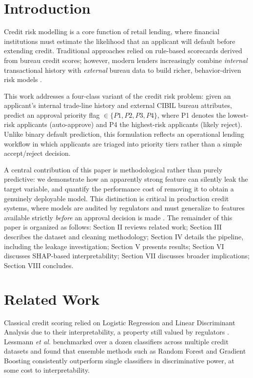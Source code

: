 \documentclass[conference]{IEEEtran}
\begin{document}
\section{Introduction}

Credit risk modelling is a core function of retail lending, where financial institutions must estimate the likelihood that an applicant will default before extending credit. Traditional approaches relied on rule-based scorecards derived from bureau credit scores; however, modern lenders increasingly combine \textit{internal} transactional history with \textit{external} bureau data to build richer, behavior-driven risk models \cite{lessmann2015}.

This work addresses a four-class variant of the credit risk problem: given an applicant's internal trade-line history and external CIBIL bureau attributes, predict an approval priority flag $\in \{P1, P2, P3, P4\}$, where P1 denotes the lowest-risk applicants (auto-approve) and P4 the highest-risk applicants (likely reject). Unlike binary default prediction, this formulation reflects an operational lending workflow in which applicants are triaged into priority tiers rather than a simple accept/reject decision.

A central contribution of this paper is methodological rather than purely predictive: we demonstrate how an apparently strong feature can silently leak the target variable, and quantify the performance cost of removing it to obtain a genuinely deployable model. This distinction is critical in production credit systems, where models are audited by regulators and must generalize to features available strictly \textit{before} an approval decision is made \cite{kaufman2012leakage}. The remainder of this paper is organized as follows: Section II reviews related work; Section III describes the dataset and cleaning methodology; Section IV details the pipeline, including the leakage investigation; Section V presents results; Section VI discusses SHAP-based interpretability; Section VII discusses broader implications; Section VIII concludes.

\section{Related Work}

Classical credit scoring relied on Logistic Regression and Linear Discriminant Analysis due to their interpretability, a property still valued by regulators \cite{thomas2002}. Lessmann \textit{et al.} \cite{lessmann2015} benchmarked over a dozen classifiers across multiple credit datasets and found that ensemble methods such as Random Forest and Gradient Boosting consistently outperform single classifiers in discriminative power, at some cost to interpretability.
\end{document}
